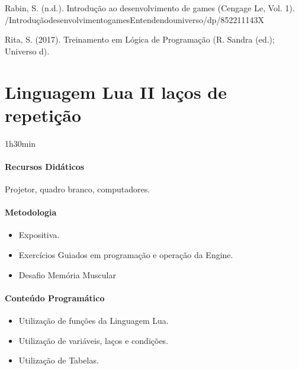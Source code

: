 \documentclass[letterpaper,10pt,brazil]{sphinxmanual}
\begin{document}
\sphinxAtStartPar
Rabin, S. (n.d.). Introdução ao desenvolvimento de games (Cengage Le, Vol. 1).
/Introdução\sphinxhyphen{}desenvolvimento\sphinxhyphen{}games\sphinxhyphen{}Entendendo\sphinxhyphen{}universo/dp/852211143X

\sphinxAtStartPar
Rita, S. (2017). Treinamento em Lógica de Programação (R. Sandra (ed.); Universo d).

\sphinxstepscope


\chapter{Linguagem Lua II \sphinxhyphen{} laços de repetição}
\label{\detokenize{modelo_aula_04:linguagem-lua-ii-lacos-de-repeticao}}\label{\detokenize{modelo_aula_04::doc}}
\sphinxAtStartPar
{} 1h30min
\subsubsection*{Recursos Didáticos}

\sphinxAtStartPar
Projetor, quadro branco, computadores.
\subsubsection*{Metodologia}
\begin{itemize}
\item {} 
\sphinxAtStartPar
Expositiva.

\item {} 
\sphinxAtStartPar
Exercícios Guiados em programação e operação da Engine.

\item {} 
\sphinxAtStartPar
Desafio \sphinxhyphen{} Memória Muscular

\end{itemize}
\subsubsection*{Conteúdo Programático}
\begin{itemize}
\item {} 
\sphinxAtStartPar
Utilização de funções da Linguagem Lua.

\item {} 
\sphinxAtStartPar
Utilização de variáveis, laços e condições.

\item {} 
\sphinxAtStartPar
Utilização de Tabelas.

\end{itemize}
\end{document}

